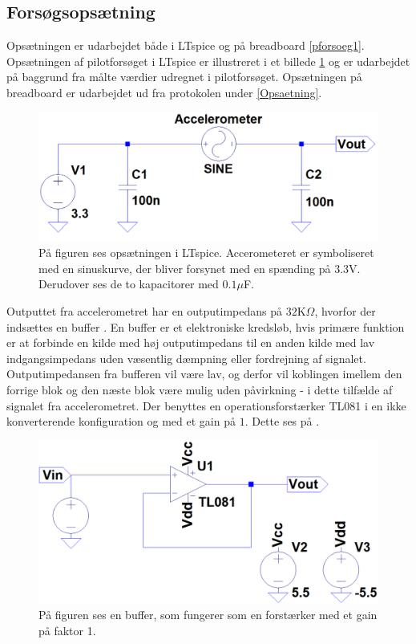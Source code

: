\subsection{Forsøgsopsætning}
Opsætningen er udarbejdet både i LTspice og på breadboard \ref{pforsoeg1}. Opsætningen af pilotforsøget i LTspice  er illustreret i et billede \ref{pLTspice} og er udarbejdet på baggrund fra målte værdier udregnet i pilotforsøget. Opsætningen på breadboard er udarbejdet ud fra protokolen under \ref{Opsaetning}.  

\begin{figure}[H]
		\centering
		\includegraphics[scale=0.4]{figures/Bilag/Test_opsaetning.PNG}
		\caption{På figuren ses opsætningen i LTspice. Accerometeret er symboliseret med en sinuskurve, der bliver forsynet med en spænding på $3.3$V. Derudover ses de to kapacitorer med $0.1\mu$F.}
		\label{pLTspice}
\end{figure}

\noindent Outputtet fra accelerometret har en outputimpedans på $32$K$\Omega$, hvorfor der indsættes en buffer \cite{Devices2009}. En buffer er et elektroniske kredsløb, hvis primære funktion er at forbinde en kilde med høj outputimpedans til en anden kilde med lav indgangsimpedans uden væsentlig dæmpning eller fordrejning af signalet. Outputimpedansen fra bufferen vil være lav, og derfor vil koblingen imellem den forrige blok og den næste blok være mulig uden påvirkning - i dette tilfælde af signalet fra accelerometret. Der benyttes en operationsforstærker TL081 i en ikke konverterende konfiguration og med et gain på $1$.\cite{Schaumann2014} Dette ses på .
\begin{figure}[H]
	\centering
	\includegraphics[scale=0.4]{figures/cProblemloesning/Buffer_LT.png}
	\caption{På figuren ses en buffer, som fungerer som en forstærker med et gain på faktor 1.}
	\label{fig:Buffer}
\end{figure}

